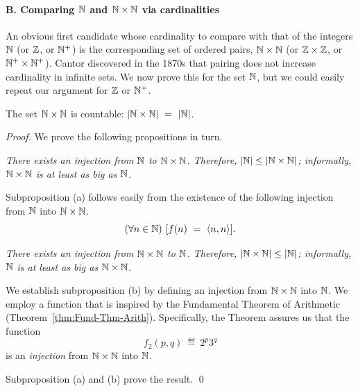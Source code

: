 \paragraph{\small\sf B. Comparing $\mathbb{N}$ and $\mathbb{N} \times \mathbb{N}$ via cardinalities}

An obvious first candidate whose cardinality to compare with that of
the integers $\mathbb{N}$ (or $\mathbb{Z}$, or $\mathbb{N}^+$) is the corresponding set of
ordered pairs, $\mathbb{N} \times \mathbb{N}$ (or $\mathbb{Z} \times \mathbb{Z}$, or $\mathbb{N}^+ \times
\mathbb{N}^+$).  Cantor discovered in the 1870s that pairing does not increase
cardinality in infinite sets.  We now prove this for the set $\mathbb{N}$, but
we could easily repeat our argument for $\mathbb{Z}$ or $\mathbb{N}^+$.

\begin{prop}
\label{thm:|NxN|=|N|}
The set $\mathbb{N} \times \mathbb{N}$ is countable:
$|\mathbb{N} \times \mathbb{N}| \ = \ |\mathbb{N}|$.
\end{prop}



\begin{proof}
We prove the following propositions in turn.

\medskip

 {\em There exists an injection from $\mathbb{N}$ to $\mathbb{N}
  \times \mathbb{N}$.  Therefore, $|\mathbb{N}| \leq |\mathbb{N} \times \mathbb{N}|$; informally, $\mathbb{N}
  \times \mathbb{N}$ is at least as big as $\mathbb{N}$.}

\smallskip

\noindent
Subproposition (a) follows easily from the existence of the following
injection from $\mathbb{N}$ into $\mathbb{N} \times \mathbb{N}$.
\[ (\forall n \in \mathbb{N}) \ [ f(n) \ = \ \langle n,n \rangle]. \]

\medskip

 {\em There exists an injection from $\mathbb{N} \times \mathbb{N}$
  to $\mathbb{N}$.  Therefore, $|\mathbb{N} \times \mathbb{N}| \leq |\mathbb{N}|$; informally, $\mathbb{N}$ is
  at least as big as $\mathbb{N} \times \mathbb{N}$.}

\smallskip

\noindent
We establish subproposition (b) by defining an injection from $\mathbb{N}
\times \mathbb{N}$ into $\mathbb{N}$.  We employ a function that is inspired by the
Fundamental Theorem of Arithmetic (Theorem~\ref{thm:Fund-Thm-Arith}).
Specifically, the Theorem assures us that the function
\[ f_2(p,q) \ \eqdef \ 2^p 3^q \]
is an {\em injection} from $\mathbb{N} \times \mathbb{N}$ into $\mathbb{N}$.

Subproposition (a) and (b) prove the result.  \qed
\end{proof}

